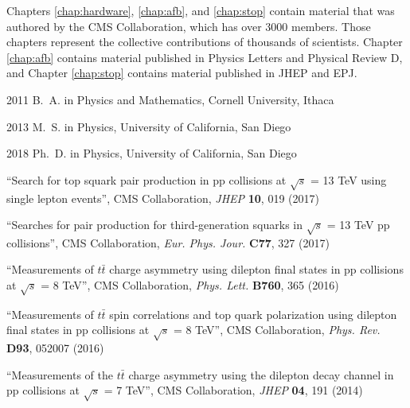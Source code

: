 \begin{frontmatter}
\begin{acknowledgements}
Chapters \ref{chap:hardware}, \ref{chap:afb}, and \ref{chap:stop}
contain material that was authored by the CMS Collaboration, which has
over 3000 members. Those chapters represent the collective
contributions of thousands of scientists. Chapter
\ref{chap:afb} contains material published in Physics Letters and
Physical Review D, and Chapter \ref{chap:stop} contains material
published in JHEP and EPJ.
\end{acknowledgements}


%
%
\begin{vitapage}
\begin{vita}
  \item[2011] B.~A. in Physics and Mathematics, Cornell University, Ithaca
  \item[2013] M.~S. in Physics, University of California, San Diego
  \item[2018] Ph.~D. in Physics, University of California, San Diego
\end{vita}
\begin{publications}
  \item ``Search for top squark pair production in pp collisions at $\sqrt{s}$ = 13 TeV using single lepton events'', CMS Collaboration, \emph{JHEP} \textbf{10}, 019 (2017) %
  \item ``Searches for pair production for third-generation squarks in $\sqrt{s}$ = 13 TeV pp collisions'', CMS Collaboration, \emph{Eur. Phys. Jour.} \textbf{C77}, 327 (2017) %
  \item ``Measurements of $t\bar{t}$ charge asymmetry using dilepton final states in pp collisions at $\sqrt{s}$ = 8 TeV'', CMS Collaboration, \emph{Phys. Lett.} \textbf{B760}, 365 (2016) %
  \item ``Measurements of $t\bar{t}$ spin correlations and top quark polarization using dilepton final states in pp collisions at $\sqrt{s}$ = 8 TeV'', CMS Collaboration, \emph{Phys. Rev.} \textbf{D93}, 052007 (2016) %
  \item ``Measurements of the $t\bar{t}$ charge asymmetry using the dilepton decay channel in pp collisions at $\sqrt{s}$ = 7 TeV'', CMS Collaboration, \emph{JHEP} \textbf{04}, 191 (2014) %
\end{publications}
\end{vitapage}



\end{frontmatter}
